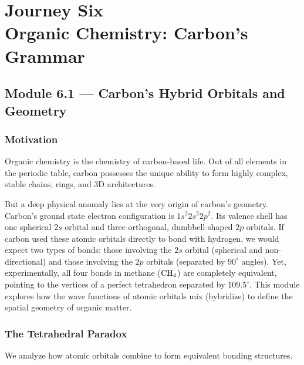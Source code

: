 \documentclass[12pt, a4paper]{book}
\begin{document}
\setcounter{chapter}{5}
\chapter[Journey 6 --- Organic Chemistry: Carbon's Grammar]
        {Journey Six\\[8pt]
         \textcolor{ModuleColor}{\large Organic Chemistry: Carbon's Grammar}}
\setcounter{section}{0}

\section{Module 6.1 --- Carbon's Hybrid Orbitals and Geometry}
\label{sec:mod6.1}

\subsection*{Motivation}

Organic chemistry is the chemistry of carbon-based life.
Out of all elements in the periodic table, carbon possesses the unique ability to form highly complex, stable chains, rings, and 3D architectures.

But a deep physical anomaly lies at the very origin of carbon's geometry.
Carbon's ground state electron configuration is $1s^2 2s^2 2p^2$.
Its valence shell has one spherical $2s$ orbital and three orthogonal, dumbbell-shaped $2p$ orbitals.
If carbon used these atomic orbitals directly to bond with hydrogen, we would expect two types of bonds: those involving the $2s$ orbital (spherical and non-directional) and those involving the $2p$ orbitals (separated by $90^\circ$ angles).
Yet, experimentally, all four bonds in methane ($\ce{CH4}$) are completely equivalent, pointing to the vertices of a perfect tetrahedron separated by $109.5^\circ$.
This module explores how the wave functions of atomic orbitals mix (hybridize) to define the spatial geometry of organic matter.

\subsection{The Tetrahedral Paradox}

We analyze how atomic orbitals combine to form equivalent bonding structures.
\end{document}
